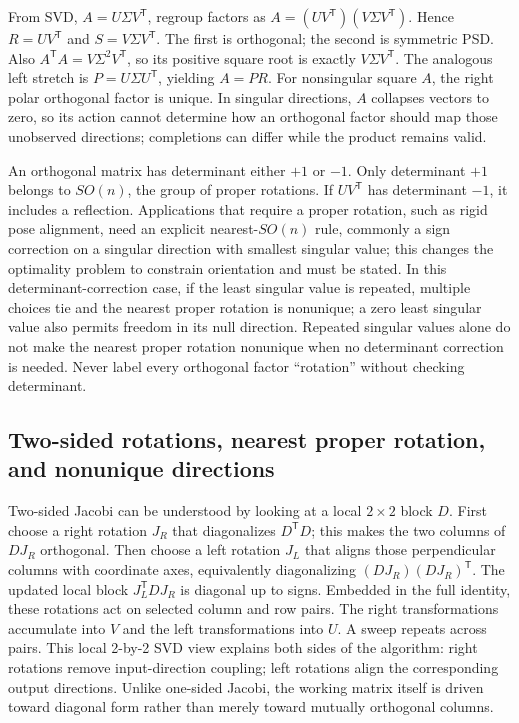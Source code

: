 From SVD, \(A=U\Sigma V^\mathsf T\), regroup factors as \(A=(UV^\mathsf T)(V\Sigma V^\mathsf T)\). Hence \(R=UV^\mathsf T\) and \(S=V\Sigma V^\mathsf T\). The first is orthogonal; the second is symmetric PSD. Also \(A^\mathsf TA=V\Sigma^2V^\mathsf T\), so its positive square root is exactly \(V\Sigma V^\mathsf T\). The analogous left stretch is \(P=U\Sigma U^\mathsf T\), yielding \(A=PR\). For nonsingular square \(A\), the right polar orthogonal factor is unique. In singular directions, \(A\) collapses vectors to zero, so its action cannot determine how an orthogonal factor should map those unobserved directions; completions can differ while the product remains valid.

An orthogonal matrix has determinant either \(+1\) or \(-1\). Only determinant \(+1\) belongs to \(SO(n)\), the group of proper rotations. If \(UV^\mathsf T\) has determinant \(-1\), it includes a reflection. Applications that require a proper rotation, such as rigid pose alignment, need an explicit nearest-\(SO(n)\) rule, commonly a sign correction on a singular direction with smallest singular value; this changes the optimality problem to constrain orientation and must be stated. In this determinant-correction case, if the least singular value is repeated, multiple choices tie and the nearest proper rotation is nonunique; a zero least singular value also permits freedom in its null direction. Repeated singular values alone do not make the nearest proper rotation nonunique when no determinant correction is needed. Never label every orthogonal factor ``rotation'' without checking determinant.

\subsection{Two-sided rotations, nearest proper rotation, and nonunique directions}\label{02-foundations-ii-ch024-two-sided-rotations-nearest-proper-rotation-and-nonunique-directions}

\hypertarget{02-foundations-ii-ch024-two-sided-rotations-nearest-proper-rotation-and-nonunique-directions}{}

Two-sided Jacobi can be understood by looking at a local \(2\times2\) block \(D\). First choose a right rotation \(J_R\) that diagonalizes \(D^\mathsf TD\); this makes the two columns of \(DJ_R\) orthogonal. Then choose a left rotation \(J_L\) that aligns those perpendicular columns with coordinate axes, equivalently diagonalizing \((DJ_R)(DJ_R)^\mathsf T\). The updated local block \(J_L^\mathsf TDJ_R\) is diagonal up to signs. Embedded in the full identity, these rotations act on selected column and row pairs. The right transformations accumulate into \(V\) and the left transformations into \(U\). A sweep repeats across pairs. This local 2-by-2 SVD view explains both sides of the algorithm: right rotations remove input-direction coupling; left rotations align the corresponding output directions. Unlike one-sided Jacobi, the working matrix itself is driven toward diagonal form rather than merely toward mutually orthogonal columns.


